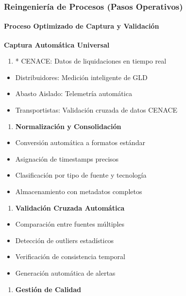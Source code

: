 \documentclass{cel}
\begin{document}
\subsubsection{Reingeniería de Procesos (Pasos Operativos)}
\nopagebreak

\paragraph{Proceso Optimizado de Captura y Validación}
\nopagebreak

\textbf{Captura Automática Universal}


\begin{enumerate}
\item * CENACE: Datos de liquidaciones en tiempo real
\end{enumerate}
\begin{itemize}
\item Distribuidores: Medición inteligente de GLD
\item Abasto Aislado: Telemetría automática
\item Transportistas: Validación cruzada de datos CENACE
\end{itemize}
\begin{enumerate}
\item \textbf{Normalización y Consolidación}
\end{enumerate}
\begin{itemize}
\item Conversión automática a formatos estándar
\item Asignación de timestamps precisos
\item Clasificación por tipo de fuente y tecnología
\item Almacenamiento con metadatos completos
\end{itemize}
\begin{enumerate}
\item \textbf{Validación Cruzada Automática}
\end{enumerate}
\begin{itemize}
\item Comparación entre fuentes múltiples
\item Detección de outliers estadísticos
\item Verificación de consistencia temporal
\item Generación automática de alertas
\end{itemize}
\begin{enumerate}
\item \textbf{Gestión de Calidad}
\end{enumerate}
\end{document}

